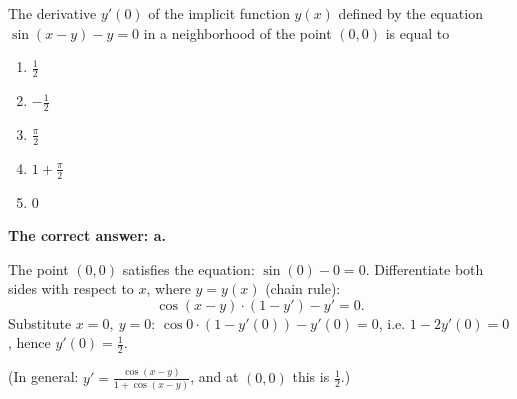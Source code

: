 
\begin{question}
The derivative $y'(0)$ of the implicit function $y(x)$ defined by the equation $\sin(x-y)-y=0$ in a neighborhood of the point $(0,0)$ is equal to
\begin{enumerate}
  \item $\frac12$
  \item $-\frac12$
  \item $\frac{\pi}{2}$
  \item $1+\frac{\pi}{2}$
  \item $0$
\end{enumerate}
\end{question}

\begin{solution}
\textbf{The correct answer: a.}

The point $(0,0)$ satisfies the equation: $\sin(0)-0=0$. Differentiate both sides with respect to $x$, where $y=y(x)$ (chain rule):
\[ \cos(x-y)\cdot(1-y')-y'=0 . \]
Substitute $x=0,\ y=0$: $\cos 0\cdot(1-y'(0))-y'(0)=0$, i.e. $1-2y'(0)=0$, hence $y'(0)=\frac12$.

(In general: $y'=\frac{\cos(x-y)}{1+\cos(x-y)}$, and at $(0,0)$ this is $\frac{1}{2}$.)
\end{solution}
